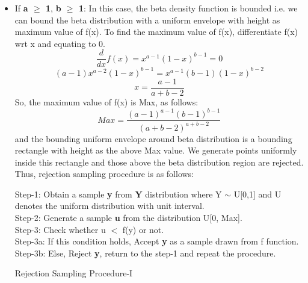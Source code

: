 \documentclass[12pt,a4paper]{article}
\begin{document}
\begin{itemize}
    \item If \textbf{a $\geq$ 1}, \textbf{b $\geq$ 1}:
    \newline
    In this case, the beta density function is bounded i.e. we can bound the beta distribution with a uniform envelope with height as maximum value of f(x). To find the maximum value of f(x), differentiate f(x) wrt x and equating to 0.
    \begin{equation*}
        \frac{d}{dx}f(x) = x^{a-1}(1-x)^{b-1} = 0
    \end{equation*}
    \begin{equation*}
        (a-1)x^{a-2}(1-x)^{b-1} = x^{a-1}(b-1)(1-x)^{b-2}
    \end{equation*}
    \begin{equation*}
        x = \frac{a-1}{a+b-2}
    \end{equation*}
    So, the maximum value of f(x) is Max, as follows:
    \begin{equation*}
        Max = \frac{(a-1)^{a-1}(b-1)^{b-1}}{(a+b-2)^{a+b-2}}
    \end{equation*}
    \newline
    and the bounding uniform envelope around beta distribution is a bounding rectangle with height as the above Max value. We generate points uniformly inside this rectangle and those above the beta distribution region are rejected. Thus, rejection sampling procedure is as follows:
    \begin{algorithm}[H]
    Step-1: Obtain a sample \textbf{y} from \textbf{Y} distribution where Y $\sim$ U[0,1] and U denotes the uniform distribution with unit interval.\;
    \\Step-2: Generate a sample \textbf{u} from the distribution U[0, Max].\; 
    \\Step-3:  Check whether u $<$ f(y) or not.
    \\\hfill Step-3a: If this condition holds, Accept \textbf{y} as a sample drawn from f function.\;
    \\\hfill Step-3b: Else, Reject \textbf{y}, return to the step-1 and repeat the procedure.\;
    \caption{Rejection Sampling Procedure-I}
    \end{algorithm}
    

\end{itemize}
\end{document}
